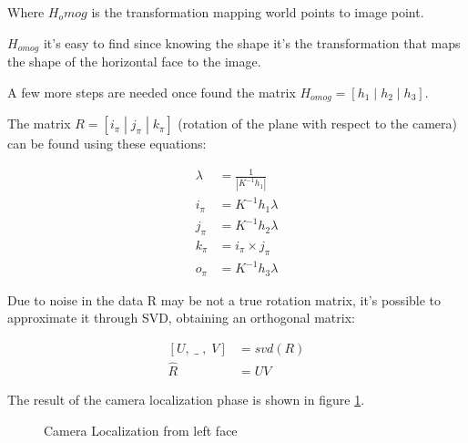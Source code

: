 \documentclass[11pt, oneside]{article}   	%
\begin{document}
Where $H_omog$ is the transformation mapping world points to image point. 

$H_{omog}$ it's easy to find since knowing the shape it's the transformation that maps the shape of the horizontal face to the image. 

A few more steps are needed once found the matrix $H_{omog} = [h_1\; |\; h_2\; |\; h_3]$. 

The matrix $R=[i_\pi\; | \; j_\pi \; | \; k_\pi]$ (rotation of the plane with respect to the camera) can be found using these equations:

\begin{subequations}
\begin{align*}
\lambda &= \frac{1}{|K^{-1}h_1|} \\
i_\pi &= K^{-1}h_1\lambda \\
j_\pi &= K^{-1}h_2\lambda \\
k_\pi &= i_\pi \times j_\pi  \\
o_\pi &= K^{-1} h_3 \lambda
\end{align*}
\end{subequations}

Due to noise in the data R may be not a true rotation matrix, it's possible to approximate it through SVD, obtaining an orthogonal matrix:

\begin{subequations}
\begin{align*}
[U,\; \_\;,\;V] &= svd(R) \\
\hat{R} &= UV
\end{align*}
\end{subequations}

The result of the camera localization phase is shown in figure \ref{left_loc}.

\begin{figure}
 \centering
    \qquad
    \caption{Camera Localization from left face}%
    \label{left_loc}%
\end{figure}
\end{document}
